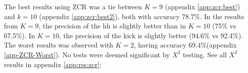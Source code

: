 %			
%			
		
		The best results using ZCR was a tie between $K=9$ (appendix \ref{app:zcr:best}) and $k=10$ (appendix \ref{app:zcr:best2}), both with accuracy 78.7\%. In the results from $K=9$, the precision of the hh is slightly better than in $K=10$ (75\% vs 67.5\%). In $K=10$, the precision of the kick is slightly better (94.6\% vs 92.4\%). The worst results was observed with $K=2$, having accuracy 69.4\%(appendix \ref{app-ZCR-Worst}). No tests were deemed significant by $X^2$ testing. See all $X^2$ results in appendix \ref{app:res:zcr};
		
		
